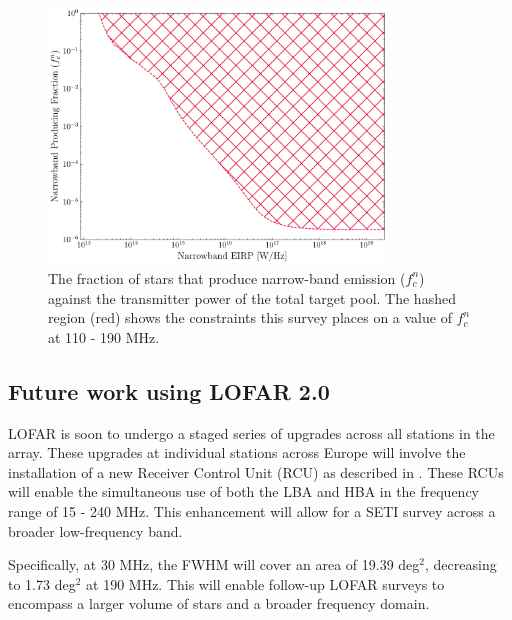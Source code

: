 \begin{figure}
    \centering
    \includegraphics[width = 0.8\textwidth]{SETI/figures/narrowband-fraction.pdf}
    \caption{The fraction of stars that produce narrow-band emission ($f^n_c$) against the transmitter power of the total target pool. The hashed region (red) shows the constraints this survey places on a value of $f^n_c$ at 110 - 190 MHz.}
    \label{fig:SETI-constraint}
\end{figure}

\subsection{Future work using LOFAR 2.0}

LOFAR is soon to undergo a staged series of upgrades across all stations in the array. These upgrades at individual stations across Europe will involve the installation of a new Receiver Control Unit (RCU) as described in \cite{LOFAR2}. These RCUs will enable the simultaneous use of both the LBA and HBA in the frequency range of 15 - 240 MHz. This enhancement will allow for a SETI survey across a broader low-frequency band.

Specifically, at 30 MHz, the FWHM will cover an area of 19.39 deg$^2$, decreasing to 1.73 deg$^2$ at 190 MHz. This will enable follow-up LOFAR surveys to encompass a larger volume of stars and a broader frequency domain.